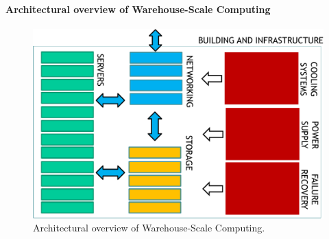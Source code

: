 \longline

\hfill

\paragraph{Architectural overview of Warehouse-Scale Computing}

\begin{figure}[!htp]
    \centering
    \includegraphics[width=\textwidth]{img/WSC-architecture-1.pdf}
    \caption{Architectural overview of Warehouse-Scale Computing.}
\end{figure}

\newpage


